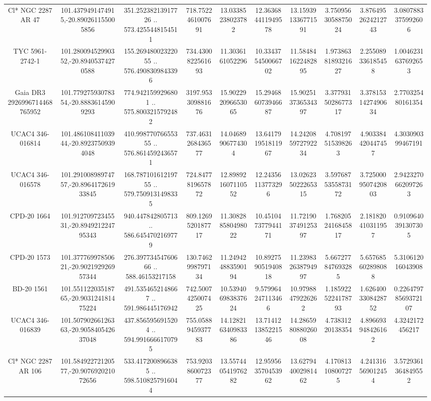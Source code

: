 \begin{table}
\begin{tabular}{cccccccccc}
Cl* NGC 2287     AR      47 & 101.4379491474915,-20.890261155005856 & 351.25238213917726 .. 573.4255448154511 & 718.7522461007691 & 13.03385238023782 & 12.363684411949578 & 13.159391336771591 & 3.7509563058875024 & 3.8764952624212743 & 3.0807883375992606 \\
TYC 5961-2742-1 & 101.28009452990352,-20.89405374270588 & 155.26948002322055 .. 576.4908309843396 & 734.4300822561693 & 11.3036161052296 & 10.334375450066702 & 11.584841622482895 & 1.9738638189321627 & 2.255089336185458 & 1.0046231637692653 \\
Gaia DR3 2926996714468765952 & 101.77927593078354,-20.88836145909293 & 774.9421599296801 .. 575.8003215792482 & 3197.953309881676 & 15.902292096653065 & 15.294686073946687 & 15.902513736534397 & 3.3779315028677317 & 3.3781531427490634 & 2.770325480161354 \\
UCAC4 346-016814 & 101.48610841103944,-20.89237509394048 & 410.99877076655355 .. 576.8614592436571 & 737.4631268436577 & 14.04689906774304 & 13.641791951811967 & 14.242085972792234 & 4.708197515398263 & 4.903384420447457 & 4.303090399467191 \\
UCAC4 346-016578 & 101.29100898974757,-20.896417261933845 & 168.78710161219755 .. 579.7509131498335 & 724.8477819657872 & 12.898921607110552 & 12.24356113773296 & 13.026235022265315 & 3.5976875355873172 & 3.7250009507420803 & 2.9423270662097263 \\
CPD-20  1664 & 101.91270972345531,-20.894921224795343 & 940.447842805713 .. 586.6454702169779 & 809.1269520187717 & 11.308288580498022 & 10.451047377944171 & 11.721903749125397 & 1.7682052416845817 & 2.181820410311957 & 0.9109640391307305 \\
CPD-20  1573 & 101.37776997850621,-20.902192926957344 & 276.39773454760666 .. 588.46153217158 & 130.7462998797134 & 11.249424883590194 & 10.892759051940818 & 11.239832638794997 & 5.667277847693285 & 5.657685602898088 & 5.310612016043908 \\
BD-20  1561 & 101.55112203518765,-20.903124181475224 & 491.5354652148667 .. 591.986445176942 & 742.5007425007425 & 10.539406983837624 & 9.579964247113466 & 10.97988479226262 & 1.1859225224178793 & 1.6264003308428752 & 0.22647978569372107 \\
UCAC4 346-016839 & 101.50790266126363,-20.905840542637048 & 437.8565956915204 .. 594.9916666170795 & 755.0588945937783 & 14.128216340983386 & 13.714121385221546 & 14.286598088026008 & 4.73831220138354 & 4.896693948426162 & 4.3242172456217 \\
Cl* NGC 2287     AR     106 & 101.58492272120577,-20.907692021072656 & 533.4172008966385 .. 598.5108257916044 & 753.9203860072377 & 13.557440541976282 & 12.959563570453962 & 13.627944002981462 & 4.170813108007275 & 4.241316569012454 & 3.5729361364849552 \\

\end{tabular}
\end{table}
